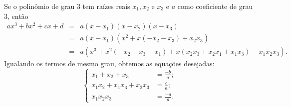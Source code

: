 Se o polinômio de grau 3 tem raízes reais $x_1,x_2$ e $x_3$ e $a$ como coeficiente de grau 3, então
\begin{eqnarray*}
	ax^3+bx^2+cx+d
	& = & a(x-x_1)(x-x_2)(x-x_3)\\
	& = & a(x-x_1)(x^2+x(-x_2-x_3)+x_2x_3)\\
	& = & a(x^3+x^2(-x_2-x_3-x_1)+x(x_2x_3+x_2x_1+x_1x_3)-x_1x_2x_3).
\end{eqnarray*}
Igualando os termos de mesmo grau, obtemos as equações desejadas:
\[
	\left\{
		\begin{array}{rl} 
			x_1+x_2+x_3 &=\frac{-b}{a};\\
			x_1x_2+x_1x_3+x_2x_3 &=\frac{c}{a};\\
			x_1x_2x_3 &=\frac{-d}{a}.
		\end{array}
	\right.
\]
